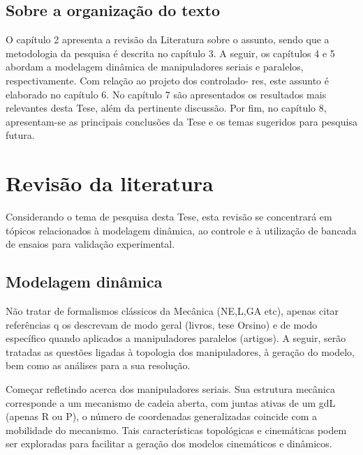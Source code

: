 \documentclass[]{politex}
\begin{document}

\section{Sobre a organização do texto}\label{organizacao}

O capítulo 2 apresenta a revisão da Literatura sobre o assunto, sendo que a metodologia da
pesquisa é descrita no capítulo 3. A seguir, os capítulos 4 e 5 abordam a modelagem dinâmica
de manipuladores seriais e paralelos, respectivamente. Com relação ao projeto dos controlado-
res, este assunto é elaborado no capítulo 6. No capítulo 7 são apresentados os resultados mais
relevantes desta Tese, além da pertinente discussão. Por fim, no capítulo 8, apresentam-se as
principais conclusões da Tese e os temas sugeridos para pesquisa futura.

\chapter{Revisão da literatura}\label{revision}

Considerando o tema de pesquisa desta Tese, esta revisão se concentrará em tópicos relacionados à modelagem dinâmica, ao controle e à utilização de bancada de ensaios para validação experimental.


\section{Modelagem dinâmica}

Não tratar de formalismos clássicos da Mecânica (NE,L,GA etc), apenas citar referências q os descrevam de modo geral (livros, tese Orsino) e de modo específico quando aplicados a manipuladores paralelos (artigos). A seguir, serão tratadas as questões ligadas à topologia dos manipuladores, à geração do modelo, bem como as análises para a sua resolução.

Começar refletindo acerca dos manipuladores seriais. Sua estrutura mecânica corresponde a um mecanismo de cadeia aberta, com juntas ativas de um gdL (apenas R ou P), o número de coordenadas generalizadas coincide com a mobilidade do mecanismo. Tais características topológicas e cinemáticas podem ser exploradas para facilitar a geração dos modelos cinemáticos e dinâmicos. 
\end{document}
